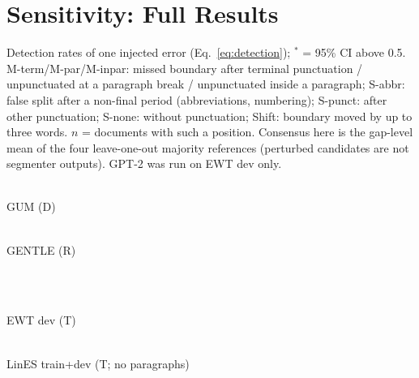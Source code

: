 
\section{Sensitivity: Full Results}
\label{app:sensitivity}
Detection rates of one injected error (Eq.~\ref{eq:detection}); $^{*}$ = 95\% CI above 0.5. M-term/M-par/M-inpar: missed
boundary after terminal punctuation / unpunctuated at a paragraph break / unpunctuated inside a paragraph; S-abbr: false
split after a non-final period (abbreviations, numbering); S-punct: after other punctuation; S-none: without punctuation;
Shift: boundary moved by up to three words. $n$ = documents with such a position. Consensus here is the gap-level mean of
the four leave-one-out majority references (perturbed candidates are not segmenter outputs). GPT-2 was run on EWT dev
only.

\begin{table}[h]
  \centering
  \small
  \begin{minipage}{0.49\textwidth}\centering
    \fitbox{}\\[2pt] GUM (D)
  \end{minipage}\hfill
  \begin{minipage}{0.49\textwidth}\centering
    \fitbox{}\\[2pt] GENTLE (R)
  \end{minipage}\\[8pt]
  \begin{minipage}{0.49\textwidth}\centering
    \fitbox{}\\[2pt] EWT dev (T)
  \end{minipage}\hfill
  \begin{minipage}{0.49\textwidth}\centering
    \fitbox{}\\[2pt] LinES train+dev (T; no paragraphs)
  \end{minipage}
  \caption{Detection rates of one injected error, all evaluators. \textbf{Bold}: best among the flat-text rows and values
  within 0.02 of it; the control column is not ranked, and the paragraphs-given row (below the rule) is shown for
  contrast.}
  \label{tab:app-sens}
\end{table}

